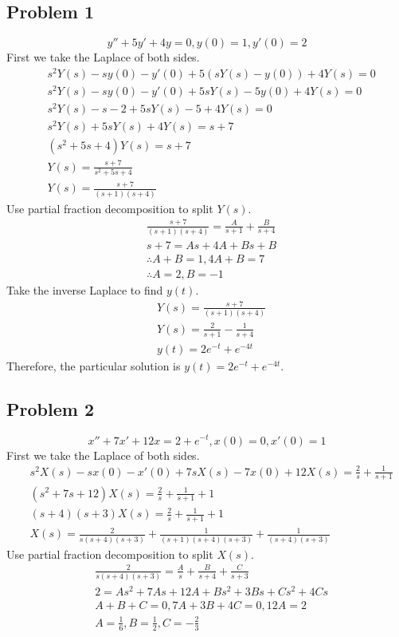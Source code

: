 \documentclass[titlepage]{article}
\begin{document}
\subsection{Problem 1}
$$y'' + 5y' + 4y = 0, y(0) = 1, y'(0) = 2$$
First we take the Laplace of both sides.
\begin{align*}
  &s^2Y(s) - sy(0) - y'(0) + 5(sY(s) - y(0)) + 4Y(s) = 0
  \\&s^2Y(s) - sy(0) - y'(0) + 5sY(s) - 5y(0) + 4Y(s) = 0
  \\&s^2Y(s) - s - 2 + 5sY(s) - 5 + 4Y(s) = 0
  \\&s^2Y(s) + 5sY(s) + 4Y(s) = s + 7
  \\&(s^2 + 5s + 4)Y(s) = s + 7
  \\&Y(s) = \frac{s + 7}{s^2  + 5s + 4}
  \\&Y(s) = \frac{s + 7}{(s + 1)(s + 4)}
\end{align*}
Use partial fraction decomposition to split $Y(s)$.
\begin{align*}
  &\frac{s + 7}{(s + 1)(s + 4)} = \frac{A}{s + 1} + \frac{B}{s + 4}
  \\& s + 7 = As + 4A + Bs + B
  \\&\therefore A + B = 1, 4A + B = 7
  \\&\therefore A = 2, B = -1
\end{align*}
Take the inverse Laplace to find $y(t)$.
\begin{align*}
  &Y(s) = \frac{s + 7}{(s + 1)(s + 4)}
  \\&Y(s) = \frac{2}{s + 1} - \frac{1}{s + 4}
  \\&y(t) = 2e^{-t} + e^{-4t}
\end{align*}
Therefore, the particular solution is $y(t) = 2e^{-t} + e^{-4t}$.

\subsection{Problem 2}
$$x'' + 7x' + 12x = 2 + e^{-t}, x(0) = 0, x'(0) = 1$$
First we take the Laplace of both sides.
\begin{align*}
  &s^2X(s) - sx(0) - x'(0) + 7sX(s) - 7x(0) + 12X(s) = \frac{2}{s} + \frac{1}{s + 1}
  \\&(s^2 + 7s + 12)X(s) = \frac{2}{s} + \frac{1}{s + 1} + 1
  \\&(s + 4)(s + 3)X(s) = \frac{2}{s} + \frac{1}{s + 1} + 1
  \\&X(s) = \frac{2}{s(s + 4)(s + 3)} + \frac{1}{(s + 1)(s + 4)(s + 3)} + \frac{1}{(s + 4)(s + 3)}
\end{align*}
Use partial fraction decomposition to split $X(s)$.
\begin{align*}
  &\frac{2}{s(s + 4)(s + 3)} = \frac{A}{s} + \frac{B}{s + 4} + \frac{C}{s + 3}
  \\&2 = As^2 + 7As + 12A + Bs^2 + 3Bs + Cs^2 + 4Cs
  \\&A + B + C = 0, 7A + 3B + 4C = 0, 12A = 2
  \\&A = \frac{1}{6}, B = \frac{1}{2}, C = -\frac{2}{3}
\end{align*}
\end{document}
